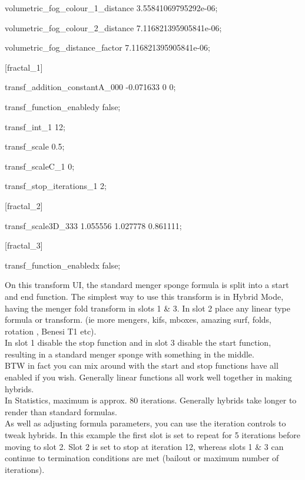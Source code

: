 volumetric\_fog\_colour\_1\_distance 3.55841069795292e-06;

volumetric\_fog\_colour\_2\_distance 7.116821395905841e-06;

volumetric\_fog\_distance\_factor 7.116821395905841e-06;

{[}fractal\_1{]}

transf\_addition\_constantA\_000 -0.071633 0 0;

transf\_function\_enabledy false;

transf\_int\_1 12;

transf\_scale 0.5;

transf\_scaleC\_1 0;

transf\_stop\_iterations\_1 2;

{[}fractal\_2{]}

transf\_scale3D\_333 1.055556 1.027778 0.861111;

{[}fractal\_3{]}

transf\_function\_enabledx false;

On this transform UI, the standard menger sponge formula is split into a
start and end function. The simplest way to use this transform is in
Hybrid Mode, having the menger fold transform in slots 1 \& 3. In slot 2
place any linear type formula or transform. (ie more mengers, kifs,
mboxes, amazing surf, folds, rotation , Benesi T1
etc).\\[2\baselineskip]In slot 1 disable the stop function and in slot 3
disable the start function, resulting in a standard menger sponge with
something in the middle.\\[2\baselineskip]BTW in fact you can mix around
with the start and stop functions have all enabled if you wish.
Generally linear functions all work well together in making
hybrids.\\[2\baselineskip]In Statistics, maximum is approx. 80
iterations. Generally hybrids take longer to render than standard
formulas.\\[2\baselineskip]As well as adjusting formula parameters, you
can use the iteration controls to tweak hybrids. In this example the
first slot is set to repeat for 5 iterations before moving to slot 2.
Slot 2 is set to stop at iteration 12, whereas slots 1 \& 3 can continue
to termination conditions are met (bailout or maximum number of
iterations).

